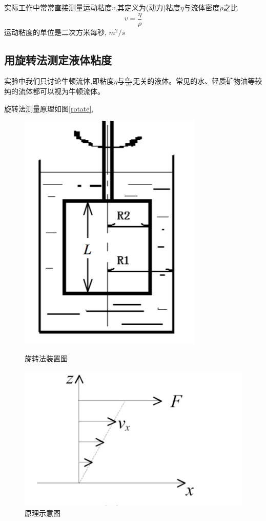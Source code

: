 \documentclass[12pt,a4paper]{ctexart}
\makeatletter
\def\maxwidth{\ifdim\Gin@nat@width>\linewidth\linewidth
\else\Gin@nat@width\fi}
\let\Oldincludegraphics\includegraphics
\renewcommand{\includegraphics}[1]{\Oldincludegraphics[width=\maxwidth]{#1}}
\makeatother
\begin{document}
实际工作中常常直接测量运动粘度\(v\),其定义为(动力)粘度\(\eta\)与流体密度\(\rho\)之比
\[v=\frac{\eta}{\rho}\] 运动粘度的单位是二次方米每秒, \(m^2/s\)

\subsection{用旋转法测定液体粘度}

实验中我们只讨论牛顿流体,即粘度\(\eta\)与\(\frac{d v_x}{d z}\)无关的液体。常见的水、轻质矿物油等较纯的流体都可以视为牛顿流体。

旋转法测量原理如图\ref{rotate},


\begin{figure}[htbp]
	\centering
	\begin{minipage}{0.4\linewidth}
	\includegraphics{media/14505376007114/rotate}
	\caption{旋转法装置图}
	\label{rotate}
	\end{minipage}
	\begin{minipage}{0.4\linewidth}
		\includegraphics{media/14505376007114/14505392660186.jpg}
		\caption{原理示意图}
		\label{p}
	\end{minipage}
\end{figure}
\end{document}

